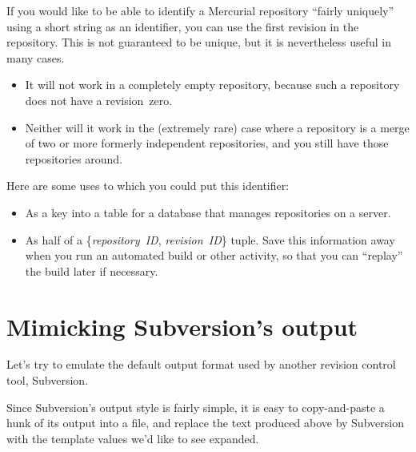 {{If you would like to be able to identify a Mercurial repository
``fairly uniquely'' using a short string as an identifier, you can
use the first revision in the repository.
This is not guaranteed to be unique, but it is nevertheless useful in
many cases.
\begin{itemize}
\item It will not work in a completely empty repository, because such
  a repository does not have a revision~zero.
\item Neither will it work in the (extremely rare) case where a
  repository is a merge of two or more formerly independent
  repositories, and you still have those repositories around.
\end{itemize}
Here are some uses to which you could put this identifier:
\begin{itemize}
\item As a key into a table for a database that manages repositories
  on a server.
\item As half of a \{\emph{repository~ID}, \emph{revision~ID}\} tuple.
  Save this information away when you run an automated build or other
  activity, so that you can ``replay'' the build later if necessary.
\end{itemize}

\section{Mimicking Subversion's output}

Let's try to emulate the default output format used by another
revision control tool, Subversion.

Since Subversion's output style is fairly simple, it is easy to
copy-and-paste a hunk of its output into a file, and replace the text
produced above by Subversion with the template values we'd like to see
expanded.

}}
